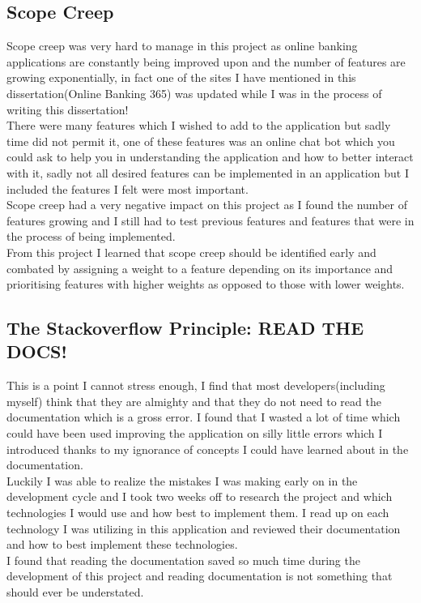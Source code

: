 \subsection{Scope Creep}
Scope creep was very hard to manage in this project as online banking applications
are constantly being improved upon and the number of features are growing exponentially, in fact
one of the sites I have mentioned in this dissertation(Online Banking 365) was updated while I was
in the process of writing this dissertation!
\\
There were many features which I wished to add to the application but sadly time did not permit it,
one of these features was an online chat bot which you could ask to help you in understanding the application
and how to better interact with it, sadly not all desired features can be implemented in an application but I included the
features I felt were most important.
\\
Scope creep had a very negative impact on this project as I found the number of features growing and I still had
to test previous features and features that were in the process of being implemented.
\\
From this project I learned that scope creep should be identified early and combated by assigning a weight to a feature depending on its importance and prioritising features with higher weights as opposed to those with lower weights.
\subsection{The Stackoverflow Principle: READ THE DOCS!}
This is a point I cannot stress enough,  I find that most developers(including myself) think that they are almighty and that they do not need to read the documentation which is a gross error.  I found that I wasted a lot of time which could have been used improving the application on silly little errors which I introduced thanks to my ignorance of concepts I could have learned about in the documentation.
\\
Luckily I was able to realize the mistakes I was making early on in the development cycle and I took two weeks off to research the project and which technologies I would use and how best to implement them.  I read up on each technology I was utilizing in this application and reviewed their documentation and how to best implement these technologies.
\\
I found that reading the documentation saved so much time during the development of this project and reading documentation is not something that should ever be understated.
